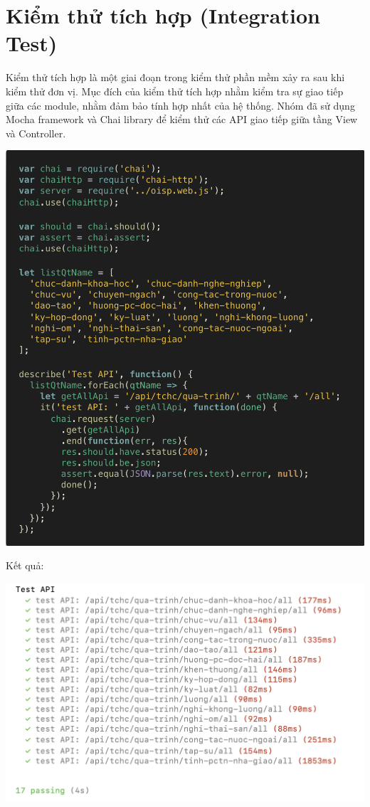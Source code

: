 \section{Kiểm thử tích hợp (Integration Test)}
Kiểm thử tích hợp là một giai đoạn trong kiểm thử phần mềm xảy ra sau khi kiểm thử đơn vị. Mục đích của kiểm thử tích hợp nhằm kiểm tra sự giao tiếp giữa các module, nhằm đảm bảo tính hợp nhất của hệ thống.
Nhóm đã sử dụng Mocha framework và Chai library để kiểm thử các API giao tiếp giữa tầng View và Controller.
\begin{center}
  \captionsetup{type=figure}
  \includegraphics[width=15cm]{img/integrationTestCode.png}
\end{center}
\newpage
Kết quả:
\begin{center}
  \captionsetup{type=figure}
  \includegraphics[width=15cm]{img/integrationTestSolution.png}
\end{center}
